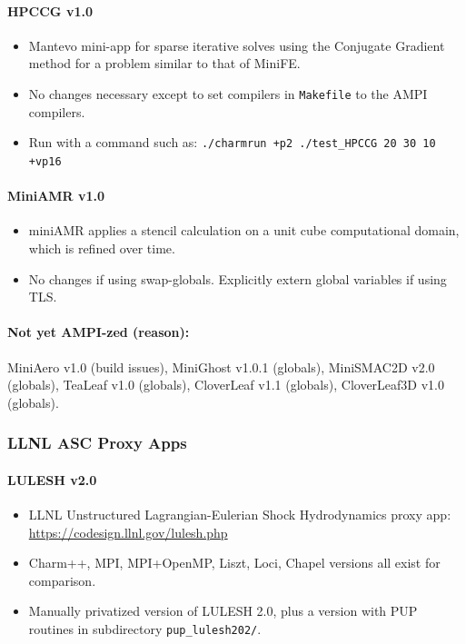 \documentclass[10pt]{article}
\begin{document}
\paragraph{HPCCG v1.0}
    \begin{itemize}
    \item
      Mantevo mini-app for sparse iterative solves using the Conjugate
      Gradient method for a problem similar to that of MiniFE.
    \item
      No changes necessary except to set compilers in \texttt{Makefile} to the AMPI
      compilers.
    \item
      Run with a command such as: \texttt{./charmrun +p2 ./test\_HPCCG 20 30 10
      +vp16}
    \end{itemize}

\paragraph{MiniAMR v1.0}
    \begin{itemize}
    \item
      miniAMR applies a stencil calculation on a unit cube computational
      domain, which is refined over time.
    \item
      No changes if using swap-globals. Explicitly extern global
      variables if using TLS.
    \end{itemize}

\paragraph{Not yet AMPI-zed (reason):} MiniAero v1.0 (build issues),
    MiniGhost v1.0.1 (globals), MiniSMAC2D v2.0 (globals), TeaLeaf
    v1.0 (globals), CloverLeaf v1.1 (globals), CloverLeaf3D v1.0
    (globals).


\subsubsection{LLNL ASC Proxy Apps}

\paragraph{LULESH v2.0}
    \begin{itemize}
    \item
      LLNL Unstructured Lagrangian-Eulerian Shock Hydrodynamics proxy
      app: \url{https://codesign.llnl.gov/lulesh.php}
    \item
      Charm++, MPI, MPI+OpenMP, Liszt, Loci, Chapel versions all exist
      for comparison.
    \item
      Manually privatized version of LULESH 2.0, plus a version with PUP
      routines in subdirectory \texttt{pup\_lulesh202/}.
    \end{itemize}
\end{document}
